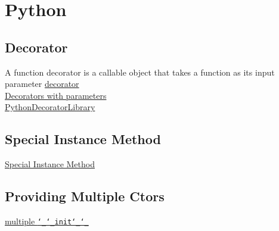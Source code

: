 \chapter{Python}
\label{chap:python}
\vspace{10.5cm}
\section{Decorator}
A function decorator is a callable object that takes a function as its 
input parameter
\href{https://www.programiz.com/python-programming/decorator}{decorator} \\
\href{https://www.geeksforgeeks.org/decorators-with-parameters-in-python/}{Decorators with parameters} \\
\href{https://wiki.python.org/moin/PythonDecoratorLibrary}{PythonDecoratorLibrary}
\newpage{}
\section{Special Instance Method}
\href{https://docs.python.org/3/reference/datamodel.html#specialnames}{Special Instance Method}


\section{Providing Multiple Ctors}
\href{https://realpython.com/python-multiple-constructors/}{multiple \texttt{\char`_\char`_init\char`_\char`_}}

\newpage
